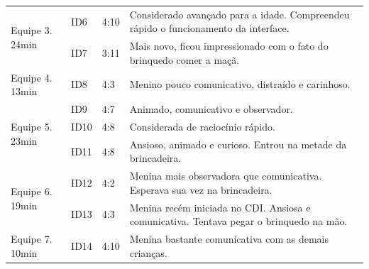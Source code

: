 \begin{quadro}[!h]
{\begin{footnotesize}
{\begin{tabular}{|l|l|l|p{11cm}|}
            \hline
            \multirow{2}{*}{Equipe 3. 24min}                & ID6               & 4:10                         & Considerado avançado para a idade. Compreendeu rápido o funcionamento da interface.                                \\ 
            \cline{2-4}
                                                            & ID7               & 3:11                         & Mais novo, ficou impressionado com o fato do brinquedo comer a maçã.                                               \\ 
            \hline
            Equipe 4. 13min                                 & ID8               & 4:3                          & Menino pouco comunicativo, distraído e carinhoso.                                                                  \\ 
            \hline
            \multirow{3}{*}{Equipe 5. 23min}                & ID9               & 4:7                          & Animado, comunicativo e observador.                                                                                \\ 
            \cline{2-4}
                                                            & ID10              & 4:8                          & Considerada de raciocínio rápido.                                                                                  \\ 
            \cline{2-4}
                                                            & ID11              & 4:8                          & Ansioso, animado e curioso. Entrou na metade da brincadeira.                                                       \\ 
            \hline
            \multirow{2}{*}{Equipe 6. 19min}                & ID12              & 4:2                          & Menina mais observadora que comunicativa. Esperava sua vez na brincadeira.                                         \\ 
            \cline{2-4}
                                                            & ID13              & 4:3                          & Menina recém iniciada no CDI. Ansiosa e comunicativa. Tentava pegar o brinquedo na mão.                            \\ 
            \hline
            \multirow{2}{*}{Equipe 7. 10min}                & ID14              & 4:10                         & Menina bastante comunicativa com as demais crianças.                                                               \\ 

\end{tabular}}
\end{footnotesize}}
\end{quadro}
